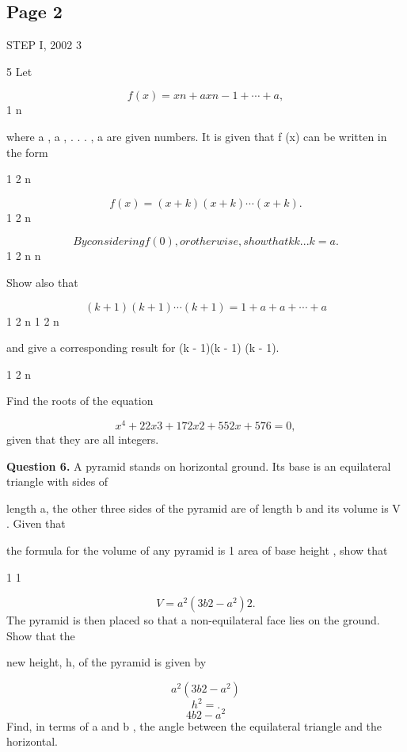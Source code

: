\documentclass[12pt]{article}
\begin{document}
\subsection*{Page 2}
\begin{flushleft}
STEP I, 2002 3\par
5 Let\par
\[f (x) = xn + a xn-1 + \cdots + a ,\]
1 n\par
where a , a , . . . , a are given numbers. It is given that f (x) can be written in the form\par
1 2 n\par
\[f (x) = (x + k )(x + k ) \cdots (x + k ) .\]
1 2 n\par
\[By considering f (0), or otherwise, show that k k . . . k = a .\]
1 2 n n\par
Show also that\par
\[(k + 1)(k + 1) \cdots (k + 1) = 1 + a + a + \cdots + a\]
1 2 n 1 2 n\par
and give a corresponding result for (k - 1)(k - 1) \cdots (k - 1).\par
1 2 n\par
Find the roots of the equation\par
\[x^4 + 22x3 + 172x2 + 552x + 576 = 0 ,\]
given that they are all integers.\par
\bigskip\textbf{Question 6.} A pyramid stands on horizontal ground. Its base is an equilateral triangle with sides of\par
length a, the other three sides of the pyramid are of length b and its volume is V . Given that\par
the formula for the volume of any pyramid is 1 \times area of base \times height , show that\par
1 1\par
\[V = a^2(3b2 - a^2) 2 .\]
The pyramid is then placed so that a non-equilateral face lies on the ground. Show that the\par
new height, h, of the pyramid is given by\par
\[a^2(3b2 - a^2)\]
\[h^2 = .\]
\[4b2 - a^2\]
Find, in terms of a and b , the angle between the equilateral triangle and the horizontal.\par
\end{flushleft}
\end{document}
